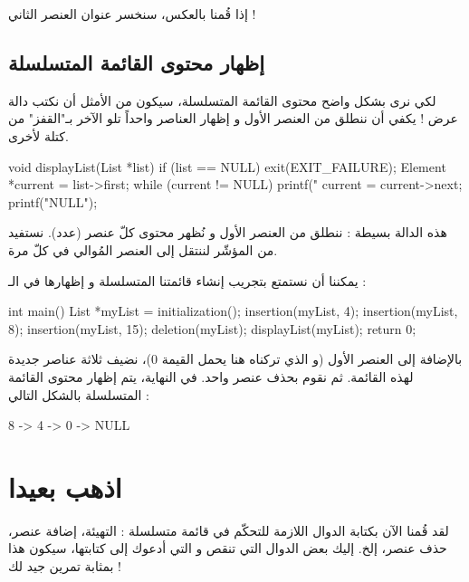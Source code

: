 إذا قُمنا بالعكس، سنخسر عنوان العنصر الثاني !

\subsection{إظهار محتوى القائمة المتسلسلة}

لكي نرى بشكل واضح محتوى القائمة المتسلسلة، سيكون من الأمثل أن نكتب دالة عرض ! يكفي أن ننطلق من العنصر الأول و إظهار العناصر واحداً تلو الآخر بـ"القفز" من كتلة لأخرى.

\begin{Csource}
void displayList(List *list)
{
	if (list == NULL)
	{
		exit(EXIT_FAILURE);
	}
	Element *current = list->first;
	while (current != NULL)
	{
		printf("%
		current = current->next;
	}
	printf("NULL\n");
}
\end{Csource}

هذه الدالة بسيطة : ننطلق من العنصر الأول و نُظهر محتوى كلّ عنصر (عدد). نستفيد من المؤشّر 
لننتقل إلى العنصر المُوالي في كلّ مرة.

يمكننا أن نستمتع بتجريب إنشاء قائمتنا المتسلسلة و إظهارها في الـ :

\begin{Csource}
int main()
{
	List *myList = initialization();
	insertion(myList, 4);
	insertion(myList, 8);
	insertion(myList, 15);
	deletion(myList);
	displayList(myList);
	return 0;
}
\end{Csource}

بالإضافة إلى العنصر الأول (و الذي تركناه هنا يحمل القيمة 0)، نضيف ثلاثة عناصر جديدة لهذه القائمة. ثم نقوم بحذف عنصر واحد. في النهاية، يتم إظهار محتوى القائمة المتسلسلة بالشكل التالي :

\begin{Console}
8 -> 4 -> 0 -> NULL
\end{Console}


\section{اذهب بعيدا}

 لقد قُمنا الآن بكتابة الدوال اللازمة للتحكّم في قائمة متسلسلة : التهيئة، إضافة عنصر، حذف عنصر، إلخ. إليك بعض الدوال التي تنقص و التي أدعوك إلى كتابتها، سيكون هذا بمثابة تمرين جيد لك !

